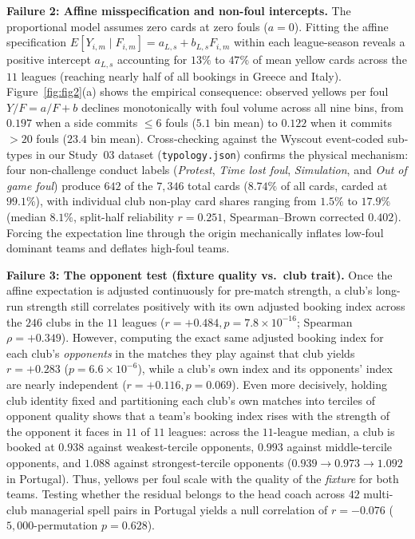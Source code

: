 \documentclass[10pt,twocolumn]{article}
\begin{document}
\textbf{Failure 2: Affine misspecification and non-foul intercepts.} The proportional model assumes zero cards at zero fouls ($a = 0$). Fitting the affine specification $E[Y_{i,m}\mid F_{i,m}] = a_{L,s} + b_{L,s} F_{i,m}$ within each league-season reveals a positive intercept $a_{L,s}$ accounting for $13\%$ to $47\%$ of mean yellow cards across the $11$ leagues (reaching nearly half of all bookings in Greece and Italy). Figure~\ref{fig:fig2}(a) shows the empirical consequence: observed yellows per foul $Y/F = a/F + b$ declines monotonically with foul volume across all nine bins, from $0.197$ when a side commits $\le 6$ fouls ($5.1$ bin mean) to $0.122$ when it commits $>20$ fouls ($23.4$ bin mean). Cross-checking against the Wyscout event-coded sub-types in our Study~03 dataset (\texttt{typology.json}) confirms the physical mechanism: four non-challenge conduct labels (\emph{Protest}, \emph{Time lost foul}, \emph{Simulation}, and \emph{Out of game foul}) produce $642$ of the $7,346$ total cards ($8.74\%$ of all cards, carded at $99.1\%$), with individual club non-play card shares ranging from $1.5\%$ to $17.9\%$ (median $8.1\%$, split-half reliability $r = 0.251$, Spearman--Brown corrected $0.402$). Forcing the expectation line through the origin mechanically inflates low-foul dominant teams and deflates high-foul teams.

\textbf{Failure 3: The opponent test (fixture quality vs.\ club trait).} Once the affine expectation is adjusted continuously for pre-match strength, a club's long-run strength still correlates positively with its own adjusted booking index across the $246$ clubs in the $11$ leagues ($r = +0.484, p = 7.8\times 10^{-16}$; Spearman $\rho = +0.349$). However, computing the exact same adjusted booking index for each club's \emph{opponents} in the matches they play against that club yields $r = +0.283$ ($p = 6.6\times 10^{-6}$), while a club's own index and its opponents' index are nearly independent ($r = +0.116, p = 0.069$). Even more decisively, holding club identity fixed and partitioning each club's own matches into terciles of opponent quality shows that a team's booking index rises with the strength of the opponent it faces in $11$ of $11$ leagues: across the $11$-league median, a club is booked at $0.938$ against weakest-tercile opponents, $0.993$ against middle-tercile opponents, and $1.088$ against strongest-tercile opponents ($0.939 \to 0.973 \to 1.092$ in Portugal). Thus, yellows per foul scale with the quality of the \emph{fixture} for both teams. Testing whether the residual belongs to the head coach across $42$ multi-club managerial spell pairs in Portugal yields a null correlation of $r = -0.076$ ($5,000$-permutation $p = 0.628$).
\end{document}
